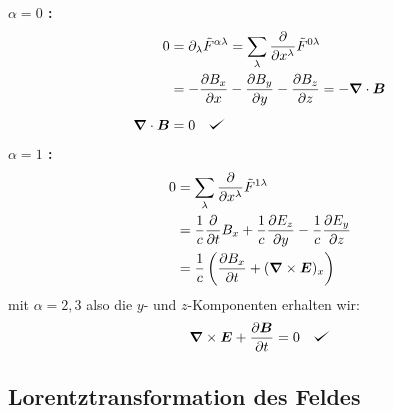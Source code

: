 \textbf{$ \alpha = 0 $ :}
\begin{align*}
0 &= \partial _{\lambda} \tilde{F}^{\alpha \lambda} = \sum_{\lambda} \prt{}{x^{\lambda}} \tilde{F}^{0 \lambda} \\
&= - \prt{B_x}{x} - \prt{B_y}{y} - \prt{B_z}{z} = - \vabla \cdot \vec{B}\\[5pt]
\vabla \cdot \vec{B} &= 0 \quad \checkmark
\end{align*}
\textbf{$ \alpha = 1 $ :}
\begin{align*}
0 &= \sum_{\lambda} \frac{\partial }{\partial x^{\lambda}} \tilde{F}^{1 \lambda} \\
&= \frac{1}{c} \frac{\partial }{\partial t} B_x + \frac{1}{c} \frac{\partial E_z}{\partial y} - \frac{1}{c} \frac{\partial E_y}{\partial z} \\
&= \frac{1}{c} \left(\frac{\partial B_x}{\partial t} + (\bm{\nabla} \times \bm{E})_x \right)\\
\end{align*}
mit $ \alpha = 2, 3 $ also die $ y $- und $ z $-Komponenten erhalten wir:
\begin{equation*}
\vabla \times \vec{E} + \prt{\vec{B}}{t} = 0 \quad \checkmark
\end{equation*}

\subsection{Lorentztransformation des Feldes}

